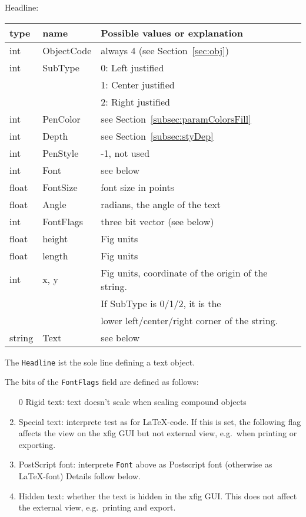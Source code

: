 \documentclass[10pt, a4paper]{article}
\begin{document}
\noindent
Headline: \\
%
\begin{tabular}{lll}
\toprule
type   & name       & Possible values or explanation \\
\midrule
\midrule
int    & ObjectCode & always 4 (see Section~\ref{sec:obj}) \\
int    & SubType    & 0: Left justified \\ %
&&                    1: Center justified \\
&&                    2: Right justified \\
int    & PenColor   & see Section~\ref{subsec:paramColorsFill} \\
int    & Depth      & see Section~\ref{subsec:styDep} \\
int    & PenStyle   & -1, not used \\
int    & Font       & see below \\
float  & FontSize   & font size in points \\
float  & Angle      & radians, the angle of the text \\
int    & FontFlags  & three bit vector (see below) \\
float  & height     & Fig units \\
float  & length     & Fig units \\
int    & x, y       & Fig units, coordinate of the origin of the string.  \\
&&                    If SubType is 0/1/2, it is the \\
&&                    lower left/center/right corner of the string.\\
string & Text       & see below \\
\bottomrule
\end{tabular}

The \texttt{Headline} ist the sole line defining a text object. 

\noindent
The bits of the \texttt{FontFlags} field are defined as follows:
%
\begin{enumerate}
\item[0]
Rigid text: text doesn't scale when scaling compound objects
\item
Special text: interprete test as for \LaTeX-code. 
If this is set, the following flag affects the view on the xfig GUI 
but not external view, e.g.~when printing or exporting. 
\item
PostScript font: interprete \texttt{Font} above 
as Postscript font (otherwise as \LaTeX{}-font) 
Details follow below. 
\item
Hidden text: whether the text is hidden in the xfig GUI\@. 
This does not affect the external view, e.g.~printing and export. 
\end{enumerate}
\end{document}
